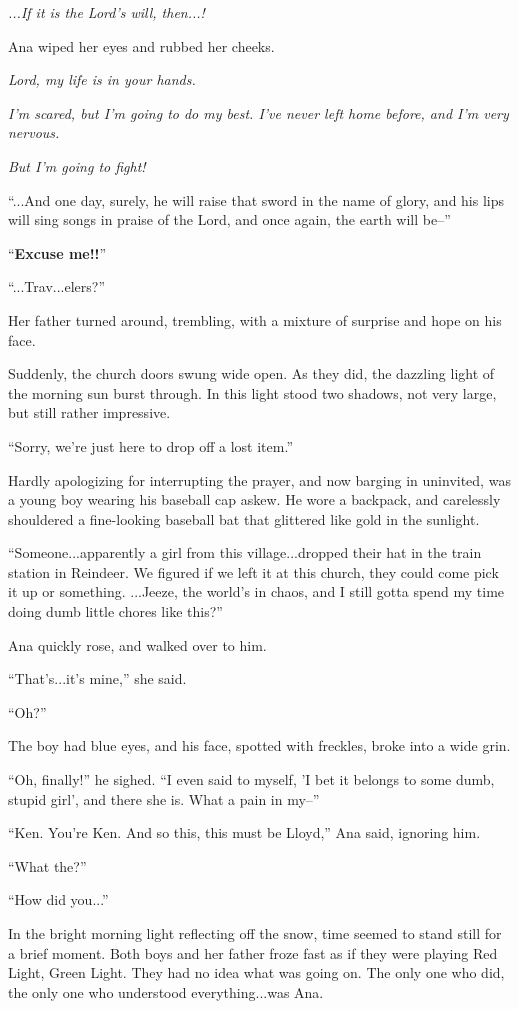 \documentclass[
]{article}
\begin{document}
\emph{...If it is the Lord's will, then...!}

Ana wiped her eyes and rubbed her cheeks.

\emph{Lord, my life is in your hands.}

\emph{I'm scared, but I'm going to do my best. I've never left home
before, and I'm very nervous.}

\emph{But I'm going to fight!}

``...And one day, surely, he will raise that sword in the name of glory,
and his lips will sing songs in praise of the Lord, and once again, the
earth will be--''

``\textbf{Excuse me!!}''

``...Trav...elers?''

Her father turned around, trembling, with a mixture of surprise and hope
on his face.

Suddenly, the church doors swung wide open. As they did, the dazzling
light of the morning sun burst through. In this light stood two shadows,
not very large, but still rather impressive.

``Sorry, we're just here to drop off a lost item.''

Hardly apologizing for interrupting the prayer, and now barging in
uninvited, was a young boy wearing his baseball cap askew. He wore a
backpack, and carelessly shouldered a fine-looking baseball bat that
glittered like gold in the sunlight.

``Someone...apparently a girl from this village...dropped their hat in
the train station in Reindeer. We figured if we left it at this church,
they could come pick it up or something. ...Jeeze, the world's in chaos,
and I still gotta spend my time doing dumb little chores like this?''

Ana quickly rose, and walked over to him.

``That's...it's mine,'' she said.

``Oh?''

The boy had blue eyes, and his face, spotted with freckles, broke into a
wide grin.

``Oh, finally!'' he sighed. ``I even said to myself, 'I bet it belongs
to some dumb, stupid girl', and there she is. What a pain in my--''

``Ken. You're Ken. And so this, this must be Lloyd,'' Ana said, ignoring
him.

``What the?''

``How did you...''

In the bright morning light reflecting off the snow, time seemed to
stand still for a brief moment. Both boys and her father froze fast as
if they were playing Red Light, Green Light. They had no idea what was
going on. The only one who did, the only one who understood
everything...was Ana.
\end{document}
